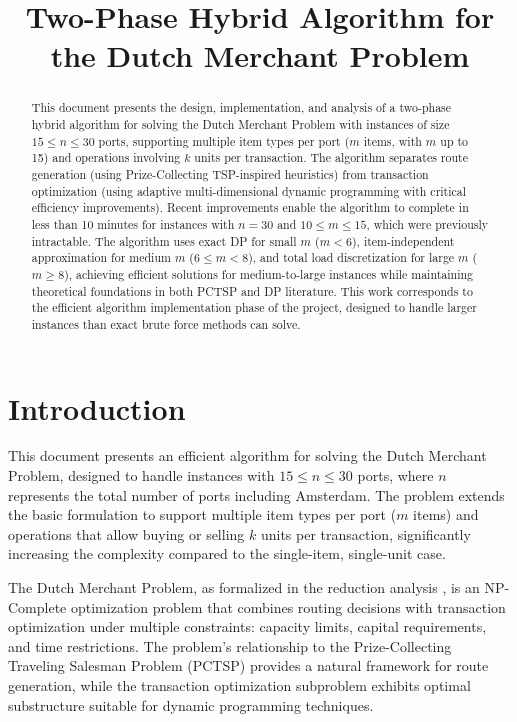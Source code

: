 \documentclass[12pt]{article}
\title{Two-Phase Hybrid Algorithm for the Dutch Merchant Problem}
\author{}
\date{}
\begin{document}
\maketitle

\begin{abstract}
This document presents the design, implementation, and analysis of a two-phase hybrid algorithm for solving the Dutch Merchant Problem with instances of size $15 \leq n \leq 30$ ports, supporting multiple item types per port ($m$ items, with $m$ up to 15) and operations involving $k$ units per transaction. The algorithm separates route generation (using Prize-Collecting TSP-inspired heuristics) from transaction optimization (using adaptive multi-dimensional dynamic programming with critical efficiency improvements). Recent improvements enable the algorithm to complete in less than 10 minutes for instances with $n=30$ and $10 \leq m \leq 15$, which were previously intractable. The algorithm uses exact DP for small $m$ ($m < 6$), item-independent approximation for medium $m$ ($6 \leq m < 8$), and total load discretization for large $m$ ($m \geq 8$), achieving efficient solutions for medium-to-large instances while maintaining theoretical foundations in both PCTSP and DP literature. This work corresponds to the efficient algorithm implementation phase of the project, designed to handle larger instances than exact brute force methods can solve.
\end{abstract}

\section{Introduction}
\label{sec:introduction}

This document presents an efficient algorithm for solving the Dutch Merchant Problem, designed to handle instances with $15 \leq n \leq 30$ ports, where $n$ represents the total number of ports including Amsterdam. The problem extends the basic formulation to support multiple item types per port ($m$ items) and operations that allow buying or selling $k$ units per transaction, significantly increasing the complexity compared to the single-item, single-unit case.

The Dutch Merchant Problem, as formalized in the reduction analysis \cite{reduction2025}, is an NP-Complete optimization problem that combines routing decisions with transaction optimization under multiple constraints: capacity limits, capital requirements, and time restrictions. The problem's relationship to the Prize-Collecting Traveling Salesman Problem (PCTSP) \cite{MarchettiSpaccamela2007PrizeCollectingTS} provides a natural framework for route generation, while the transaction optimization subproblem exhibits optimal substructure suitable for dynamic programming techniques.
\end{document}
